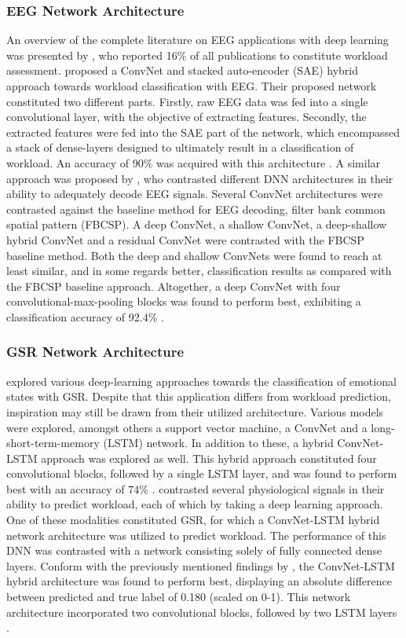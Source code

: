 \documentclass[fleqn,11pt]{paper}
\begin{document}
\subsubsection*{EEG Network Architecture}
An overview of the complete literature on EEG applications with deep learning was presented by , who reported 16\% of all publications to constitute workload assessment.  proposed a ConvNet and stacked auto-encoder (SAE) hybrid approach towards workload classification with EEG. Their proposed network constituted two different parts. Firstly, raw EEG data was fed into a single convolutional layer, with the objective of extracting features. Secondly, the extracted features were fed into the SAE part of the network,  which encompassed a stack of dense-layers designed to ultimately result in a classification of workload.  An accuracy of 90\% was acquired with this architecture \cite{tabar2016novel}. A similar approach was proposed by , who contrasted different DNN architectures in their ability to adequately decode EEG signals. Several ConvNet architectures were contrasted against the baseline method for EEG decoding, filter bank common spatial pattern (FBCSP). A deep ConvNet, a shallow ConvNet, a deep-shallow hybrid ConvNet and a residual ConvNet were contrasted with the FBCSP baseline method. Both the deep and shallow ConvNets were found to reach at least similar, and in some regards better, classification results as compared with the FBCSP baseline approach. Altogether, a deep ConvNet with four convolutional-max-pooling blocks was found to perform best, exhibiting a classification accuracy of 92.4\% \cite{schirrmeister2017deep}.

\subsubsection*{GSR Network Architecture}
 explored various deep-learning approaches towards the classification of emotional states with GSR. Despite that this application differs from workload prediction, inspiration may still be drawn from their utilized architecture. Various models were explored, amongst others a support vector machine, a ConvNet and a long-short-term-memory (LSTM) network. In addition to these, a hybrid ConvNet-LSTM approach was explored as well. This hybrid approach constituted four convolutional blocks, followed by a single LSTM layer, and was found to perform best with an accuracy of 74\% \cite{sun2019hybrid}.  contrasted several physiological signals in their ability to predict workload, each of which by taking a deep learning approach. One of these modalities constituted GSR, for which a ConvNet-LSTM hybrid network architecture was utilized to predict workload. The performance of this DNN was contrasted with a network consisting solely of fully connected dense layers. Conform with the previously mentioned findings by  , the ConvNet-LSTM hybrid architecture was found to perform best, displaying an absolute difference between predicted and true label of 0.180 (scaled on 0-1). This network architecture incorporated two convolutional blocks, followed by two LSTM layers \cite{dolmans2020perceived}.
\end{document}
